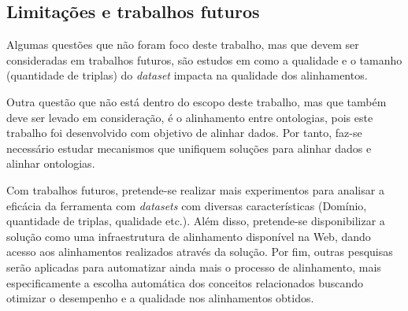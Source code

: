\subsection{Limitações e trabalhos futuros}

Algumas questões que não foram foco deste trabalho, mas que devem ser consideradas em trabalhos futuros, são estudos em como a qualidade e o tamanho (quantidade de triplas) do \textit{dataset} impacta na qualidade dos alinhamentos.

Outra questão que não está dentro do escopo deste trabalho, mas que também deve ser levado em consideração, é o alinhamento entre ontologias, pois este trabalho foi desenvolvido com objetivo de alinhar dados. Por tanto, faz-se necessário estudar mecanismos que unifiquem soluções para alinhar dados e alinhar ontologias.

Com trabalhos futuros, pretende-se realizar mais experimentos para analisar a eficácia da ferramenta com \textit{datasets} com diversas características (Domínio, quantidade de triplas, qualidade etc.). Além disso, pretende-se disponibilizar a solução como uma infraestrutura de alinhamento disponível na Web, dando acesso aos alinhamentos realizados através da solução. Por fim, outras pesquisas serão aplicadas para automatizar ainda mais o processo de alinhamento, mais especificamente a escolha automática dos conceitos relacionados buscando otimizar o desempenho e a qualidade nos alinhamentos obtidos.
